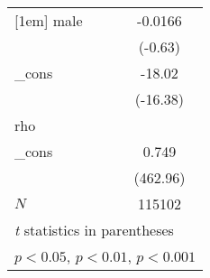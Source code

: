 {\begin{tabular}{l*{1}{c}}
[1em]
male        &     -0.0166         \\
            &     (-0.63)         \\
[1em]
\_cons      &      -18.02\sym{***}\\
            &    (-16.38)         \\
\hline
rho         &                     \\
\_cons      &       0.749\sym{***}\\
            &    (462.96)         \\
\hline
\(N\)       &      115102         \\
\hline\hline
\multicolumn{2}{l}{\footnotesize \textit{t} statistics in parentheses}\\
\multicolumn{2}{l}{\footnotesize \sym{*} \(p<0.05\), \sym{**} \(p<0.01\), \sym{***} \(p<0.001\)}\\
\end{tabular}
}
